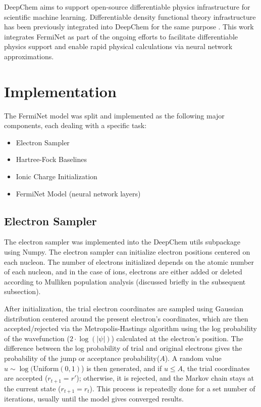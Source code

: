 \documentclass[letterpaper]{article} %
\begin{document}
DeepChem aims to support open-source differentiable physics \cite{ramsundar2021differentiable} infrastructure for scientific machine learning. Differentiable density functional theory infrastructure has been previously integrated into DeepChem for the same purpose \cite{vidhyadhiraja2023open}. This work integrates FermiNet \cite{pfau2020ferminet} as part of the ongoing efforts to facilitate differentiable physics support and enable rapid physical calculations via neural network approximations.


\section{Implementation}
The FermiNet model was split and implemented as the following major components, each dealing with a specific task:
\begin{itemize}
\item Electron Sampler
\item Hartree-Fock Baselines
\item Ionic Charge Initialization
\item FermiNet Model (neural network layers)
\end{itemize}

\subsection{Electron Sampler}
The electron sampler was implemented into the DeepChem utils subpackage using Numpy. The electron sampler can initialize electron positions centered on each nucleon. The number of electrons initialized depends on the atomic number of each nucleon, and in the case of ions, electrons are either added or deleted according to Mulliken population analysis (discussed briefly in the subsequent subsection).

After initialization, the trial electron coordinates are sampled using Gaussian distribution centered around the present electron's coordinates, which are then accepted/rejected via the Metropolis-Hastings algorithm using the log probability of the wavefunction ($2 \cdot \log(|\psi|)$) calculated at the electron's position. The difference between the log probability of trial and original electrons gives the probability of the jump or acceptance probability($A$). A random value \(u \sim \log(\mathrm{Uniform}(0, 1)\)) is then generated, and if \(u \leq A\), the trial coordinates are accepted (\(r_{t+1} = r'\)); otherwise, it is rejected, and the Markov chain stays at the current state (\(r_{t+1} = r_t\)). This process is repeatedly done for a set number of iterations, usually until the model gives converged results.
\end{document}
